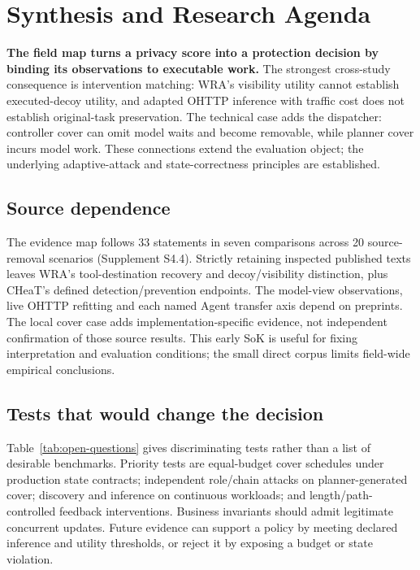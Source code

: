 \section{Synthesis and Research Agenda}\label{sec:agenda}
\textbf{The field map turns a privacy score into a protection decision by binding its observations to executable work.}
The strongest cross-study consequence is intervention matching: WRA's visibility utility cannot establish executed-decoy utility, and adapted OHTTP inference with traffic cost does not establish original-task preservation. The technical case adds the dispatcher: controller cover can omit model waits and become removable, while planner cover incurs model work. These connections extend the evaluation object; the underlying adaptive-attack and state-correctness principles are established.

\subsection{Source dependence}\label{sec:sensitivity}
The evidence map follows 33 statements in seven comparisons across 20 source-removal scenarios (Supplement S4.4). Strictly retaining inspected published texts leaves WRA's tool-destination recovery and decoy/visibility distinction, plus CHeaT's defined detection/prevention endpoints. The model-view observations, live OHTTP refitting and each named Agent transfer axis depend on preprints. The local cover case adds implementation-specific evidence, not independent confirmation of those source results. This early SoK is useful for fixing interpretation and evaluation conditions; the small direct corpus limits field-wide empirical conclusions.

\subsection{Tests that would change the decision}
Table~\ref{tab:open-questions} gives discriminating tests rather than a list of desirable benchmarks. Priority tests are equal-budget cover schedules under production state contracts; independent role/chain attacks on planner-generated cover; discovery and inference on continuous workloads; and length/path-controlled feedback interventions. Business invariants should admit legitimate concurrent updates. Future evidence can support a policy by meeting declared inference and utility thresholds, or reject it by exposing a budget or state violation.


